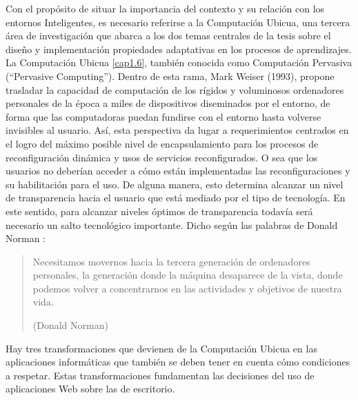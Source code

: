 Con el propósito de situar la importancia del contexto y su relación con los entornos
Inteligentes, es necesario referirse a la Computación Ubicua, una tercera área de
investigación que abarca a los dos temas centrales de la tesis sobre el diseño y implementación propiedades adaptativas en los procesos de aprendizajes. La Computación
Ubicua \ref{cap1.6}, también conocida como Computación Pervasiva (“Pervasive
Computing”). 
Dentro de esta rama, Mark Weiser (1993), propone trasladar la capacidad de
computación de
los rígidos y voluminosos ordenadores personales de la época a miles de dispositivos
diseminados por el entorno, de forma que las computadoras puedan fundirse con el
entorno hasta volverse invisibles al usuario. Así, esta perspectiva da lugar a requerimientos centrados en el logro del máximo
posible nivel de encapsulamiento para los procesos de reconfiguración
dinámica y usos de servicios reconfigurados. O sea que los usuarios no deberían
acceder a cómo están implementadas las reconfiguraciones y su habilitación para
el uso. De alguna manera, esto determina alcanzar un nivel de transparencia hacia
el usuario que está mediado por el tipo de tecnología. En este sentido, para
alcanzar niveles óptimos de transparencia todavía será necesario un salto
tecnológico importante. Dicho según las palabras de Donald Norman
\cite{cap1.196}:

\begin{quote}
Necesitamos movernos hacia la tercera generación de ordenadores
personales, la generación donde la máquina desaparece de la vista,
donde podemos volver a concentrarnos en las actividades y objetivos
de nuestra vida.
\begin{flushright} (Donald Norman) \end{flushright}
\end{quote} 

Hay tres transformaciones que devienen de la Computación Ubicua en las
aplicaciones informáticas que también se deben tener en cuenta cómo
condiciones a respetar. Estas transformaciones fundamentan las decisiones del uso de
aplicaciones Web sobre las de escritorio.

